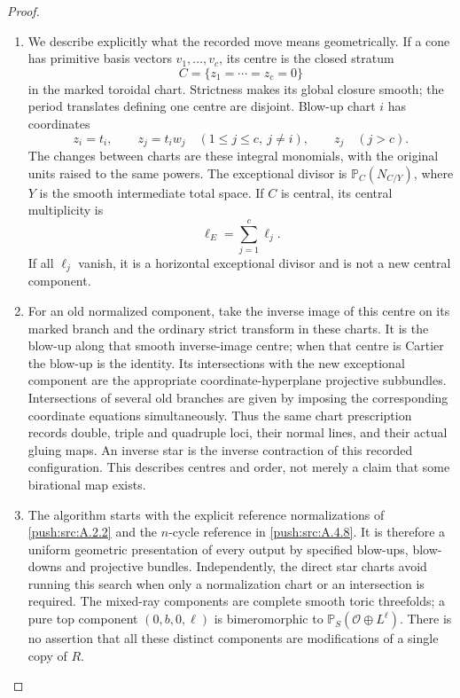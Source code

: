 \begin{proof}
\begin{enumerate}[label=\arabic*.,leftmargin=*]
\item We describe explicitly what the recorded move means
geometrically. If a cone has primitive basis vectors
$v_1,\ldots,v_c$, its centre is the closed stratum
\[
 C=\{z_1=\cdots=z_c=0\}
\]
in the marked toroidal chart. Strictness makes its
global closure smooth; the period translates defining
one centre are disjoint. Blow-up chart $i$ has
coordinates
\[
 z_i=t_i,\qquad z_j=t_i w_j\quad
 (1\leq j\leq c,\ j\ne i),
 \qquad z_j\quad(j>c).
\]
The changes between charts are these integral
monomials, with the original units raised to the
same powers. The exceptional divisor is
$\mathbb P_C(N_{C/Y})$, where $Y$ is the smooth
intermediate total space. If $C$ is central, its
central multiplicity is
\[
 \ell_E=\sum_{j=1}^c\ell_j.
\]
If all $\ell_j$ vanish, it is a horizontal exceptional
divisor and is not a new central component.

\item For an old normalized component, take the inverse
image of this centre on its marked branch and the
ordinary strict transform in these charts. It is
the blow-up along that smooth inverse-image centre;
when that centre is Cartier the blow-up is the
identity. Its intersections with the new exceptional
component are the appropriate coordinate-hyperplane
projective subbundles. Intersections of several old
branches are given by imposing the corresponding
coordinate equations simultaneously. Thus the same
chart prescription records double, triple and
quadruple loci, their normal lines, and their actual
gluing maps. An inverse star is the inverse
contraction of this recorded configuration. This
describes centres and order, not merely a claim that
some birational map exists.

\item The algorithm starts with the explicit reference
normalizations of \ref{push:src:A.2.2} and the $n$-cycle reference
in \ref{push:src:A.4.8}. It is therefore a uniform geometric
presentation of every output by specified blow-ups,
blow-downs and projective bundles. Independently,
the direct star charts avoid running this search
when only a normalization chart or an intersection
is required. The mixed-ray components are complete
smooth toric threefolds; a pure top component
$(0,b,0,\ell)$ is bimeromorphic to
$\mathbb P_S(\mathcal O\oplus L^\ell)$.
There is no assertion that all these distinct
components are modifications of a single copy of $R$.


\end{enumerate}
\end{proof}
